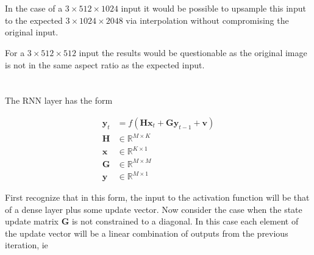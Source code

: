 \documentclass[12pt]{article}
\begin{document}
\section{}

In the case of a $3 \times 512 \times 1024$ input it would be possible to
upsample this input to the expected $3 \times 1024 \times 2048$ via
interpolation without compromising the original input.
\newline

For a $3 \times 512 \times 512$ input the results would be questionable as the
original image is not in the same aspect ratio as the expected input.

\section{}

The RNN layer has the form

\begin{align}
	\boldsymbol{y}_t &= f(\boldsymbol{H}\boldsymbol{x}_t +
	\boldsymbol{G}\boldsymbol{y}_{t-1} + \boldsymbol{v}) \\
	\boldsymbol{H} &\in \mathbb{R}^{M \times K} \\
	\boldsymbol{x} &\in \mathbb{R}^{K \times 1} \\
	\boldsymbol{G} &\in \mathbb{R}^{M \times M} \\
	\boldsymbol{y} &\in \mathbb{R}^{M \times 1}
\end{align}

First recognize that in this form, the input to the activation function will be
that of a dense layer plus some update vector.
Now consider the case when the state update matrix $\boldsymbol{G}$ is not
constrained to a diagonal. In this case each element of the update vector will
be a linear combination of outputs from the previous iteration, ie
\end{document}
